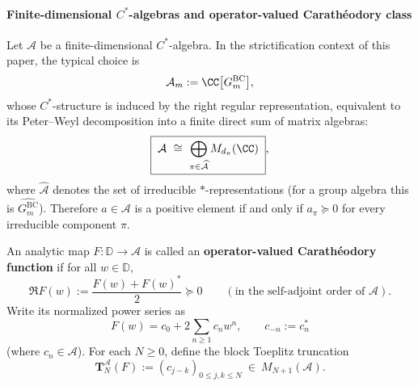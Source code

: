 \paragraph{Finite-dimensional \(C^\ast\)-algebras and operator-valued Carath\'eodory class}
Let \(\mathcal{A}\) be a finite-dimensional \(C^\ast\)-algebra.
In the strictification context of this paper, the typical choice is
\[
\mathcal{A}_m:=\CC\bigl[G^{\mathrm{BC}}_m\bigr],
\]
whose \(C^\ast\)-structure is induced by the right regular representation, equivalent to its Peter--Weyl decomposition into a finite direct sum of matrix algebras:
\begin{equation}\label{eq:xi-A-peter-weyl}
\boxed{\;
\mathcal{A}
\ \cong\
\bigoplus_{\pi\in\widehat{\mathcal{A}}} M_{d_\pi}(\CC)\; },
\end{equation}
where \(\widehat{\mathcal{A}}\) denotes the set of irreducible \(\ast\)-representations (for a group algebra this is \(\widehat{G^{\mathrm{BC}}_m}\)).
Therefore \(a\in\mathcal{A}\) is a positive element if and only if \(a_\pi\succeq 0\) for every irreducible component \(\pi\).
\par
An analytic map \(F:\mathbb{D}\to\mathcal{A}\) is called an \textbf{operator-valued Carath\'eodory function} if for all \(w\in\mathbb{D}\),
\[
\Re F(w):=\frac{F(w)+F(w)^\ast}{2}\succeq 0
\qquad(\text{in the self-adjoint order of }\mathcal{A}).
\]
Write its normalized power series as
\begin{equation}\label{eq:xi-operator-carath-series}
\boxed{\;
F(w)=c_0+2\sum_{n\ge 1}c_n w^n,\qquad c_{-n}:=c_n^\ast\;}
\end{equation}
(where \(c_n\in\mathcal{A}\)).
For each \(N\ge 0\), define the block Toeplitz truncation
\begin{equation}\label{eq:xi-block-toeplitz-def}
\boxed{\;
\mathbf{T}^{\mathcal{A}}_N(F):=(c_{j-k})_{0\le j,k\le N}\ \in\ M_{N+1}(\mathcal{A}).\;}
\end{equation}

